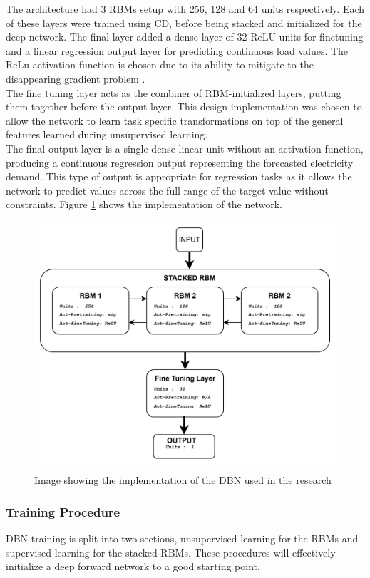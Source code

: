 The architecture had 3 RBMs setup with 256, 128 and 64 units respectively. Each of these layers were trained using CD, before being stacked and initialized for the deep network. The final layer added a dense layer of 32 ReLU units for finetuning and a linear regression output layer for predicting continuous load values. The ReLu activation function is chosen due to its ability to mitigate to the disappearing gradient problem \cite{dong2017short}.\\
 The fine tuning layer acts as the combiner of RBM-initialized layers, putting them together before the output layer. This design implementation was chosen to allow the network to learn task specific transformations on top of the general features learned during unsupervised learning.\\
 The final output layer is a single dense linear unit without an activation function, producing a continuous regression output representing the forecasted electricity demand. This type of output is appropriate for regression tasks as it allows the network to predict values across the full range of the target value without constraints. Figure \ref{fig:dbnimplementation} shows the implementation of the network.
\begin{figure}[H]
	\centering
	\includegraphics[width=0.7\linewidth]{Chapters/images/DBN_IMPLEMENTATION}
	\caption{Image showing the implementation of the DBN used in the research}
	\label{fig:dbnimplementation}
\end{figure}


\subsubsection{Training Procedure}
 DBN training is split into two sections, unsupervised learning for the RBMs and supervised learning for the stacked RBMs. These procedures will effectively initialize a deep forward network to a good starting point.
 
